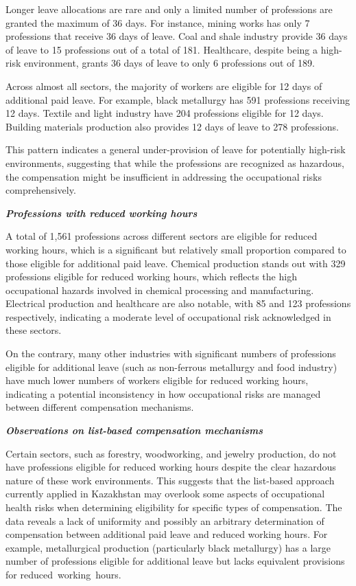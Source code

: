 \begin{multicols}{2}
Longer leave allocations are rare and only a limited number of
professions are granted the maximum of 36 days. For instance, mining
works has only 7 professions that receive 36 days of leave. Coal and
shale industry provide 36 days of leave to 15 professions out of a total
of 181. Healthcare, despite being a high-risk environment, grants 36
days of leave to only 6 professions out of 189.

Across almost all sectors, the majority of workers are eligible for 12
days of additional paid leave. For example, black metallurgy has 591
professions receiving 12 days. Textile and light industry have 204
professions eligible for 12 days. Building materials production also
provides 12 days of leave to 278 professions.

This pattern indicates a general under-provision of leave for
potentially high-risk environments, suggesting that while the
professions are recognized as hazardous, the compensation might be
insufficient in addressing the occupational risks comprehensively.

\emph{{\bfseries Professions with reduced working hours}}

A total of 1,561 professions across different sectors are eligible for
reduced working hours, which is a significant but relatively small
proportion compared to those eligible for additional paid leave.
Chemical production stands out with 329 professions eligible for reduced
working hours, which reflects the high occupational hazards involved in
chemical processing and manufacturing. Electrical production and
healthcare are also notable, with 85 and 123 professions respectively,
indicating a moderate level of occupational risk acknowledged in these
sectors.

On the contrary, many other industries with significant numbers of
professions eligible for additional leave (such as non-ferrous
metallurgy and food industry) have much lower numbers of workers
eligible for reduced working hours, indicating a potential inconsistency
in how occupational risks are managed between different compensation
mechanisms.

\emph{{\bfseries Observations on list-based compensation mechanisms}}

Certain sectors, such as forestry, woodworking, and jewelry production,
do not have professions eligible for reduced working hours despite the
clear hazardous nature of these work environments. This suggests that
the list-based approach currently applied in Kazakhstan may overlook
some aspects of occupational health risks when determining eligibility
for specific types of compensation. The data reveals a lack of
uniformity and possibly an arbitrary determination of compensation
between additional paid leave and reduced working hours. For example,
metallurgical production (particularly black metallurgy) has a large
number of professions eligible for additional leave but lacks equivalent
provisions for reduced~working~hours.


\end{multicols}
